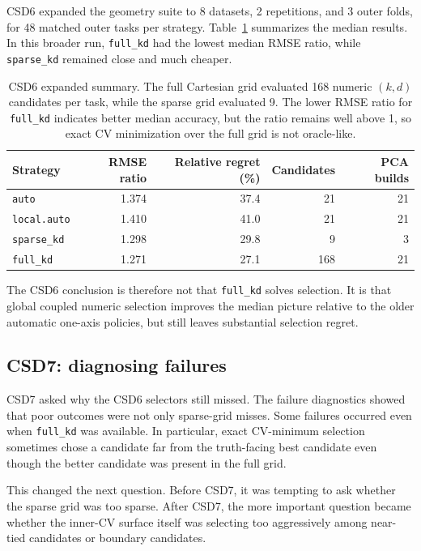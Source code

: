 \documentclass[11pt]{article}
\newcommand{\code}[1]{\texttt{#1}}
\begin{document}
CSD6 expanded the geometry suite to 8 datasets, 2 repetitions, and 3 outer folds,
for 48 matched outer tasks per strategy.  Table~\ref{tab:csd6} summarizes the
median results.  In this broader run, \code{full\_kd} had the lowest median RMSE
ratio, while \code{sparse\_kd} remained close and much cheaper.

\begin{table}[htbp]
\centering
\caption{CSD6 expanded summary.  The full Cartesian grid evaluated 168 numeric
$(k,d)$ candidates per task, while the sparse grid evaluated 9.  The lower RMSE
ratio for \code{full\_kd} indicates better median accuracy, but the ratio remains
well above 1, so exact CV minimization over the full grid is not oracle-like.}
\label{tab:csd6}
\begin{tabular}{lrrrr}
\toprule
Strategy & RMSE ratio & Relative regret (\%) & Candidates & PCA builds\\
\midrule
\code{auto}       & 1.374 & 37.4 & 21  & 21\\
\code{local.auto} & 1.410 & 41.0 & 21  & 21\\
\code{sparse\_kd} & 1.298 & 29.8 &  9  &  3\\
\code{full\_kd}   & 1.271 & 27.1 & 168 & 21\\
\bottomrule
\end{tabular}
\end{table}

The CSD6 conclusion is therefore not that \code{full\_kd} solves selection.  It
is that global coupled numeric selection improves the median picture relative to
the older automatic one-axis policies, but still leaves substantial selection
regret.

\subsection{CSD7: diagnosing failures}

CSD7 asked why the CSD6 selectors still missed.  The failure diagnostics showed
that poor outcomes were not only sparse-grid misses.  Some failures occurred even
when \code{full\_kd} was available.  In particular, exact CV-minimum selection
sometimes chose a candidate far from the truth-facing best candidate even though
the better candidate was present in the full grid.

This changed the next question.  Before CSD7, it was tempting to ask whether the
sparse grid was too sparse.  After CSD7, the more important question became
whether the inner-CV surface itself was selecting too aggressively among near-tied
candidates or boundary candidates.
\end{document}
